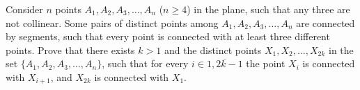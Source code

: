 Consider $n$ points $A_1,A_2,A_3,\ldots, A_n$ ($n\geq 4$) in the plane, such that any three are not collinear. Some pairs of distinct points among $A_1,A_2,A_3,\ldots, A_n$ are connected by segments, such that every point is connected with at least three different points. Prove that there exists $k>1$ and the distinct points $X_1,X_2,\ldots, X_{2k}$ in the set $\{A_1,A_2,A_3,\ldots, A_n\}$,  such that for every $i\in \overline{1,2k-1}$ the point $X_i$ is connected with $X_{i+1}$,  and $X_{2k}$ is connected with $X_1$.